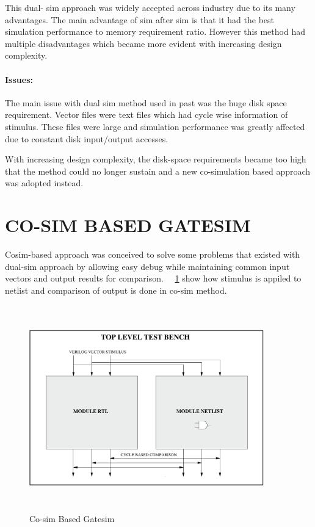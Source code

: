This dual- sim approach was widely accepted across industry due to its many advantages. The main advantage of sim after sim is that it had the best simulation performance to memory requirement ratio. However this method had multiple disadvantages which became more evident with increasing design complexity.

\paragraph{Issues:}The main issue with dual sim method used in past was the huge disk space requirement. Vector files were text files which had cycle wise information of stimulus. These files were large and simulation performance was greatly affected due to constant disk input/output accesses. 

 
 With increasing design complexity, the disk-space requirements became too high that the method could no longer sustain and a new co-simulation based approach was adopted instead.





\section{CO-SIM BASED GATESIM}
 Cosim-based approach was conceived to solve some problems that existed with dual-sim approach by allowing easy debug while maintaining common input vectors and output results for comparison.  ~\figurename{~\ref{fig:cosim.ps}} show how stimulus is appiled to netlist and comparison of output is done in co-sim method.
 
\begin{figure}[h!]
\centering
\includegraphics[width=4in, height=3.5in]{./figures/cosim.ps}
\caption{Co-sim Based Gatesim}
\label{fig:cosim.ps}
\end{figure}


